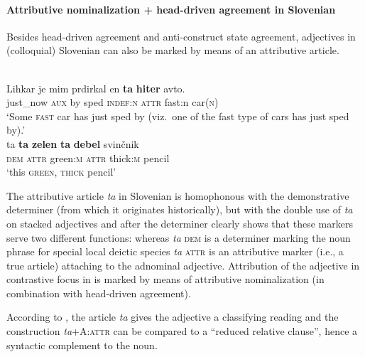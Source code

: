\paragraph*{Attributive nominalization + head\hyp{}driven agreement in Slovenian}
Besides head\hyp{}driven agreement and anti\hyp{}construct state agreement, adjectives in (colloquial) Slovenian can also be marked by means of an attributive article.
\begin{exe}
\label{slovenian art}
\begin{xlist}
\\
\gll	Lihkar je mim prdirkal en \textbf{ta} \textbf{hiter} avto.\\
	just\_now \textsc{aux} by sped \textsc{indef:n} \textsc{attr} fast:n car(\textsc{n})\\
\glt	‘Some \textsc{fast} car has just sped by (viz.~one of the fast type of cars has just sped by).’ 
\\
\label{slovenian def}
\gll 	ta \textbf{ta} \textbf{zelen} \textbf{ta} \textbf{debel} svin\v{c}nik\\
	\textsc{dem} \textsc{attr} green\textsc{:m} \textsc{attr} thick\textsc{:m} pencil\\
\glt 	‘this \textsc{green}, \textsc{thick} pencil’
\end{xlist}
\end{exe}
The attributive article \textit{ta} in Slovenian is homophonous with the demonstrative determiner (from which it originates historically), but  with the double use of \textit{ta} on stacked adjectives and after the determiner clearly shows that these markers serve two different functions: whereas \textit{ta} \textsc{dem} is a determiner marking the noun phrase for special local deictic species \textit{ta} \textsc{attr} is an attributive marker (i.e., a true article) attaching to the adnominal adjective. Attribution of the adjective in contrastive focus in  is marked by means of attributive nominalization (in combination with head\hyp{}driven agreement).

According to \citet{marusic-etal2007,marusic-etal2007b}, the article \textit{ta} gives the adjective a classifying reading and the construction \textit{ta}+A:\textsc{attr} can be compared to a “reduced relative clause”, hence a syntactic complement to the noun.

